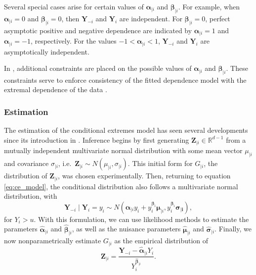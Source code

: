 \documentclass{article}
\numberwithin{equation}{section}
\begin{document}
Several special cases arise for certain values of $\bm{\alpha}_{\mid i}$ and $\bm{\beta}_{\mid i}$.
For example, when $\bm{\alpha}_{\mid i} = 0$ and $\bm{\beta}_{\mid i} = 0$, then $\bm{Y}_{-i}$ and $\bm{Y}_i$ are independent.
For $\bm{\beta}_{\mid i} = 0$, perfect asymptotic positive and negative dependence are indicated by $\bm{\alpha}_{\mid i} = 1$ and $\bm{\alpha}_{\mid i} = -1$, respectively.
For the values $-1 < \bm{\alpha}_{\mid i} < 1$, $\bm{Y}_{-i}$ and $\bm{Y}_i$ are asymptotically independent.


In \citet{Keef2013}, additional constraints are placed on the possible values of $\bm{\alpha}_{\mid i}$ and $\bm{\beta}_{\mid i}$.
These constraints serve to enforce consistency of the fitted dependence model with the extremal dependence of the data \citep{Southworth2024_vignette}.

\subsubsection{Estimation} \label{subsubsec:estimation}

The estimation of the conditional extremes model has seen several developments since its introduction in \citet{Heffernan2004}.
Inference begins by first generating $\bm{Z}_{\mid i} \in \mathbb{R}^{d-1}$ from a mutually independent multivariate normal distribution with some mean vector $\mu_{\mid i}$ and covariance $\sigma_{\mid i}$, i.e.\ $\bm{Z}_{\mid i} \sim N(\mu_{\mid i}, \sigma_{\mid i})$. 
This initial form for $G_{\mid i}$, the distribution of $\bm{Z}_{\mid i}$, was chosen experimentally. 
Then, returning to equation \eqref{eq:ce_model}, the conditional distribution also follows a multivariate normal distribution, with
\[
  \bm{Y}_{-i} \mid \bm{Y}_i = y_i \sim N\left(\bm{\alpha}_{\mid i} y_i + y_i^{\bm{\beta}_i} \bm{\mu}_{\mid i}, y_i^{\bm{\beta}_i} \bm{\sigma_{\mid i}}\right),
\]
for $Y_i > u$. 
With this formulation, we can use likelihood methods to estimate the parameters $\hat{\bm{\alpha}}_{\mid i}$ and $\hat{\bm{\beta}}_{\mid i}$, as well as the nuisance parameters $\hat{\bm{\mu}}_{\mid i}$ and $\hat{\bm{\sigma}}_{\mid i}$.
Finally, we now nonparametrically estimate $G_{\mid i}$ as the empirical distribution of 
\[
  \bm{Z}_{\mid i} = \frac{\bm{Y}_{-i} - \hat{\bm{\alpha}}_{\mid i}Y_i}{Y_i^{\hat{\bm{\beta}}_{\mid i}}}.
\]
\end{document}
